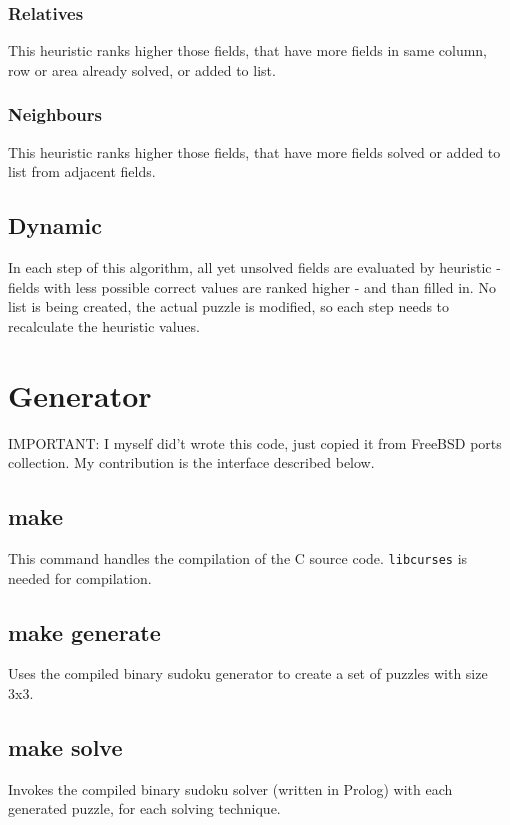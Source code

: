 \documentclass{article}
\begin{document}
	\subsubsection{Relatives}
	This heuristic ranks higher those fields, that have more fields in same column, row or area already solved, or added to list.
	\subsubsection{Neighbours}
	This heuristic ranks higher those fields, that have more fields solved or added to list from adjacent fields.
	\subsection{Dynamic}
	In each step of this algorithm, all yet unsolved fields are evaluated by heuristic - fields with less possible correct values are ranked higher - and than filled in. No list is being created, the actual puzzle is modified, so each step needs to recalculate the heuristic values.
	\section{Generator}
	IMPORTANT: I myself did't wrote this code, just copied it from FreeBSD ports collection. My contribution is the interface described below.
	\subsection{make}
	This command handles the compilation of the C source code. {\tt libcurses} is needed for compilation.
	\subsection{make generate}
	Uses the compiled binary sudoku generator to create a set of puzzles with size 3x3.
	\subsection{make solve}
	Invokes the compiled binary sudoku solver (written in Prolog) with each generated puzzle, for each solving technique.
\end{document}
